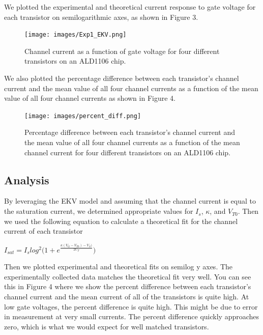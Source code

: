 \documentclass{article}
\begin{document}
We plotted the experimental and theoretical current response to gate voltage for each transistor on semilogarithmic axes, as shown in Figure 3.

\begin{figure}[H]   
  \begin{center}      
  \texttt{[image: images/Exp1\_EKV.png]}
  \caption{Channel current as a function of gate voltage for four different transistors on an ALD1106 chip.}
  \label{fig:exp1_plot1}
  \end{center}
\end{figure}

We also plotted the percentage difference between each transistor’s channel current and the mean value of all four channel currents as a function of the mean value of all four channel currents as shown in Figure 4.

\begin{figure}[H]
  \begin{center}       
  \texttt{[image: images/percent\_diff.png]}
  \label{fig:exp1_plot2}
  \caption{Percentage difference between each transistor's channel current and the mean value of all four channel currents as a function of the mean channel current for four different transistors on an ALD1106 chip.}
  \end{center}
\end{figure}
\subsection{Analysis}
By leveraging the EKV model and assuming that the channel current is equal to the saturation current, we determined appropriate values for $I_s$, $\kappa$, and $V_{T0}$.
Then we used the following equation to calculate a theoretical fit for the channel current of each transistor
\begin{center}
 $I_{sat} = I_{s}log^{2}{(1 + e^{\frac{\kappa(V_G - V_{T0}) - V_S)}{2U_T}}})$
\end{center}

Then we plotted experimental and theoretical fits on semilog y axes. The experimentally collected data matches the theoretical fit very well. You can see this in Figure 4 where we show the percent difference between each transistor's channel current and the mean current of all of the transistors is quite high. At low gate voltages, the percent difference is quite high. This might be due to error in measurement at very small currents. The percent difference quickly approaches zero, which is what we would expect for well matched transistors.
\end{document}

